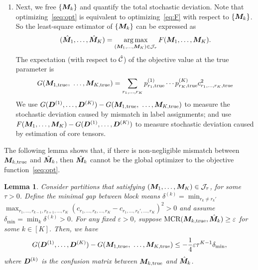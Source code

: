 \documentclass{article}
\newtheorem{lemma}{Lemma}
\begin{document}
\begin{appendices}
\begin{enumerate}
\item Next, we free $\{\bm M_k\}$ and quantify the total stochastic deviation. Note that optimizing~\eqref{seq:opt} is equivalent to optimizing~\eqref{eq:F} with respect to $\{\bm M_k\}$. So the least-square estimator of $\{\bm M_k\}$ can be expressed as
\begin{equation}
   (\hat{\bm M}_1,\ldots,\hat{\bm M}_K) = \displaystyle\operatorname*{arg\,max}_{(\bm M_1,\ldots,\bm M_K)\in \mathcal{J}_\tau}F(\bm M_1,\ldots,\bm M_K).
\end{equation}
The expectation (with respect to $\hat {\mathcal{C}}$) of the objective value at the true parameter is
\[
G(\mM_{1,\text{true}},\ \ldots,\mM_{K,\text{true}})=\sum_{r_1,\ldots,r_K} p^{(1)}_{r_1,\text{true}} \cdots p^{(K)}_{r_K,\text{true}}c^2_{r_1,\ldots,r_K,\text{true}}
\]
We use $ G(\mD^{(1)},\ldots,\mD^{(K)})-G(\mM_{1,\text{true}},\ \ldots,\mM_{K,\text{true}})$ to measure the stochastic deviation caused by mismatch in label assignments; and use $F(\bm M_1,\ldots,\bm M_K)-G(\bm{D}^{(1)},\ldots,\bm{D}^{(K)})$ to measure stochastic deviation caused by estimation of core tensors.  


\end{enumerate}

The following lemma shows that, if there is non-negligible mismatch between $\bm M_{k,\text{true}}$ and $\hat {\bm M}_k$, then $\hat {\bm M}_k$ cannot be the global optimizer to the objective function~\eqref{seq:opt}.

\begin{lemma}\label{1}
Consider partitions that satisfying $(\bm M_1,\ldots,\bm M_K)\in \mathcal{J}_\tau$, for some $\tau>0$. 
Define the minimal gap between block means $\delta^{(k)}=\min_{r_k\neq r_k'}$ $\max_{r_1,\ldots,r_{k-1},r_{k+1},\ldots,r_K}(c_{r_1,\ldots,r_k,\ldots,r_K}-c_{r_1,\ldots,r_k',\ldots,r_K})^2>0$ and assume $\delta_{\min}=\min_k\delta^{(k)}>0$. For any fixed $\varepsilon>0$, suppose $\text{MCR}(\bm M_{k,\text{true}}, \hat {\bm M}_k)\geq \varepsilon $ for some $k\in[K]$. Then, we have
\begin{equation*}
    G(\mD^{(1)},\ldots,\mD^{(K)})-G(\mM_{1,\text{true}},\ \ldots,\mM_{K,\text{true}}) \leq -\frac{1}{4}\varepsilon\tau^{K-1}\delta_{\min},
\end{equation*}
where $\bm{D}^{(k)}$ is the confusion matrix between $\bm M_{k,\text{true}}$ and $\hat {\bm M}_k$.
\end{lemma}


\end{appendices}
\end{document}

